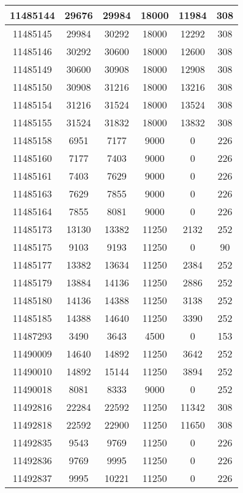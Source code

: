 \begin{appendices}
\begin{center}
\begin{longtable}{|c|c|c|c|c|c|}
11485144 & 29676 & 29984 & 18000 & 11984 & 308 \\ \hline
11485145 & 29984 & 30292 & 18000 & 12292 & 308 \\ \hline
11485146 & 30292 & 30600 & 18000 & 12600 & 308 \\ \hline
11485149 & 30600 & 30908 & 18000 & 12908 & 308 \\ \hline
11485150 & 30908 & 31216 & 18000 & 13216 & 308 \\ \hline
11485154 & 31216 & 31524 & 18000 & 13524 & 308 \\ \hline
11485155 & 31524 & 31832 & 18000 & 13832 & 308 \\ \hline
11485158 & 6951  & 7177  & 9000  & 0     & 226 \\ \hline
11485160 & 7177  & 7403  & 9000  & 0     & 226 \\ \hline
11485161 & 7403  & 7629  & 9000  & 0     & 226 \\ \hline
11485163 & 7629  & 7855  & 9000  & 0     & 226 \\ \hline
11485164 & 7855  & 8081  & 9000  & 0     & 226 \\ \hline
11485173 & 13130 & 13382 & 11250 & 2132  & 252 \\ \hline
11485175 & 9103  & 9193  & 11250 & 0     & 90  \\ \hline
11485177 & 13382 & 13634 & 11250 & 2384  & 252 \\ \hline
11485179 & 13884 & 14136 & 11250 & 2886  & 252 \\ \hline
11485180 & 14136 & 14388 & 11250 & 3138  & 252 \\ \hline
11485185 & 14388 & 14640 & 11250 & 3390  & 252 \\ \hline
11487293 & 3490  & 3643  & 4500  & 0     & 153 \\ \hline
11490009 & 14640 & 14892 & 11250 & 3642  & 252 \\ \hline
11490010 & 14892 & 15144 & 11250 & 3894  & 252 \\ \hline
11490018 & 8081  & 8333  & 9000  & 0     & 252 \\ \hline
11492816 & 22284 & 22592 & 11250 & 11342 & 308 \\ \hline
11492818 & 22592 & 22900 & 11250 & 11650 & 308 \\ \hline
11492835 & 9543  & 9769  & 11250 & 0     & 226 \\ \hline
11492836 & 9769  & 9995  & 11250 & 0     & 226 \\ \hline
11492837 & 9995  & 10221 & 11250 & 0     & 226 \\ \hline

\end{longtable}
\end{center}
\end{appendices}
